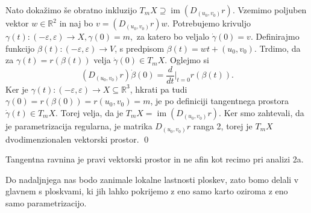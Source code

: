 Nato dokažimo še obratno inkluzijo $T_mX \supseteq
\operatorname{im} \left( D_{(u_0, v_0)}r \right)$. Vzemimo poljuben
vektor $w \in \mathbb{R}^2$ in naj bo $v = \left( D_{(u_0, v_0)} r \right) w$. Potrebujemo krivuljo $\gamma(t) : (-\varepsilon, \varepsilon) \to  X,
\gamma(0) = m,$ za katero bo veljalo $\dot{\gamma} (0) = v.$  Definirajmo funkcijo $\beta(t): (-\varepsilon, \varepsilon) \to V$,
s predpisom $\beta(t) = wt + (u_0, v_0)$. Trdimo, da za $\gamma(t) =
r(\beta(t))$  velja $\dot{\gamma}(0) \in  T_mX.$
Oglejmo si \begin{equation*} \left( D_{(u_0, v_0)}r \right)\dot{\beta} (0) =
\frac{d}{dt} \big|_{t = 0} r(\beta(t)). \end{equation*}   Ker je $\gamma(t): (-\varepsilon,
\varepsilon)\to  X \subseteq \mathbb{R}^3$, hkrati pa tudi $\gamma(0) = r(\beta(0) )= r(u_0, v_0) = m$, je po definiciji tangentnega prostora $\dot{\gamma}(t) \in T_mX$. Torej velja,
da je $T_mX = \operatorname{im}(D_{(u_0,v_0)}r)$. Ker smo zahtevali,
da je parametrizacija regularna, je matrika $D_{(u_0,v_0)}r$ ranga 2,
torej je  $T_mX$ dvodimenzionalen vektorski prostor.
\qed

\begin{opomba}
 Tangentna ravnina je pravi vektorski prostor in ne afin kot
 recimo pri analizi 2a.
\end{opomba}

Do nadaljnjega nas bodo zanimale lokalne lastnosti ploskev, zato bomo
delali v glavnem s ploskvami, ki jih lahko pokrijemo z eno samo karto
oziroma z eno samo parametrizacijo.

